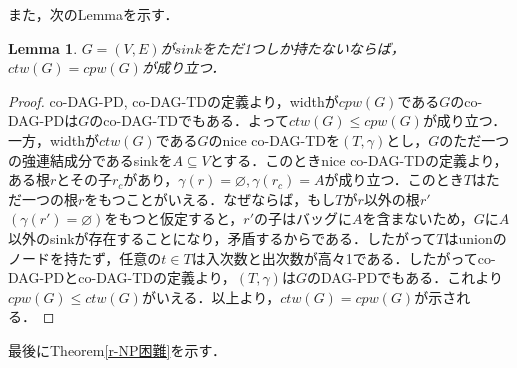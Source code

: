 \documentclass[master]{kuisthesis}		%
\theoremstyle{plain}
\newtheorem{lemma}{Lemma}
\theoremstyle{definition}
\begin{document}
また，次のLemmaを示す．

\begin{lemma}\label{r-sink}
    $G =(V, E)$が$sink$をただ1つしか持たないならば，$ctw(G) = cpw(G)$が成り立つ．
\end{lemma}

\begin{proof}
    co-DAG-PD, co-DAG-TDの定義より，widthが$cpw(G)$である$G$のco-DAG-PDは$G$のco-DAG-TDでもある．よって$ctw(G) \leq cpw(G)$が成り立つ．一方，widthが$ctw(G)$である$G$のnice co-DAG-TDを$(T, \gamma)$とし，$G$のただ一つの強連結成分であるsinkを$A \subseteq V$とする．このときnice co-DAG-TDの定義より，ある根$r$とその子$r_c$があり，$\gamma(r) = \varnothing, \gamma(r_c) = A$が成り立つ．このとき$T$はただ一つの根$r$をもつことがいえる．なぜならば，もし$T$が$r$以外の根$r'$ $(\gamma(r') = \varnothing)$をもつと仮定すると，$r'$の子はバッグに$A$を含まないため，$G$に$A$以外のsinkが存在することになり，矛盾するからである．したがって$T$はunionのノードを持たず，任意の$t \in T$は入次数と出次数が高々1である．したがってco-DAG-PDとco-DAG-TDの定義より，$(T, \gamma)$は$G$のDAG-PDでもある．これより$cpw(G) \leq ctw(G)$がいえる．以上より，$ctw(G) = cpw(G)$が示される．
\end{proof}





最後にTheorem\ref{r-NP困難}を示す．
\end{document}
